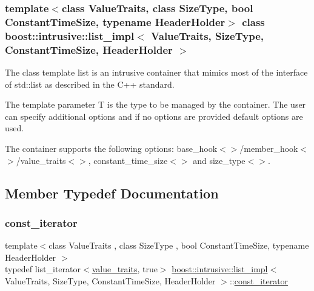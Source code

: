 \subsubsection*{template$<$class Value\+Traits, class Size\+Type, bool Constant\+Time\+Size, typename Header\+Holder$>$\newline
class boost\+::intrusive\+::list\+\_\+impl$<$ Value\+Traits, Size\+Type, Constant\+Time\+Size, Header\+Holder $>$}

The class template list is an intrusive container that mimics most of the interface of std\+::list as described in the C++ standard.

The template parameter {\ttfamily T} is the type to be managed by the container. The user can specify additional options and if no options are provided default options are used.

The container supports the following options\+: {\ttfamily base\+\_\+hook$<$$>$/member\+\_\+hook$<$$>$/value\+\_\+traits$<$$>$}, {\ttfamily constant\+\_\+time\+\_\+size$<$$>$} and {\ttfamily size\+\_\+type$<$$>$}. 

\subsection{Member Typedef Documentation}
\mbox{\label{classboost_1_1intrusive_1_1list__impl_af4ced710fe02662c5650d161af83d8cd}} 
\subsubsection{\texorpdfstring{const\+\_\+iterator}{const\_iterator}}
{\footnotesize\ttfamily template$<$class Value\+Traits , class Size\+Type , bool Constant\+Time\+Size, typename Header\+Holder $>$ \\
typedef list\+\_\+iterator$<$\hyperlink{classboost_1_1intrusive_1_1list__impl_a5cd55672f6df367749d91ef708834126}{value\+\_\+traits}, true$>$ \hyperlink{classboost_1_1intrusive_1_1list__impl}{boost\+::intrusive\+::list\+\_\+impl}$<$ Value\+Traits, Size\+Type, Constant\+Time\+Size, Header\+Holder $>$\+::\hyperlink{classboost_1_1intrusive_1_1list__impl_af4ced710fe02662c5650d161af83d8cd}{const\+\_\+iterator}}

